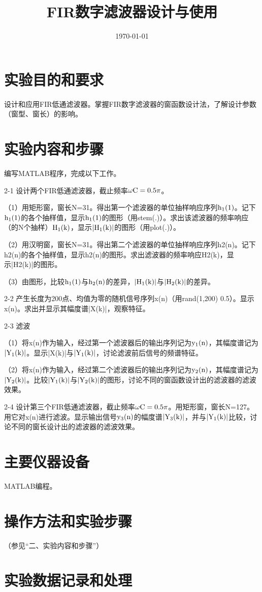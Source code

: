 \documentclass{../source/Experiment}
\title{FIR数字滤波器设计与使用}
\date{\today}
\begin{document}
\makeheader
\section{实验目的和要求}
设计和应用FIR低通滤波器。掌握FIR数字滤波器的窗函数设计法，了解设计参数（窗型、窗长）的影响。
\section{实验内容和步骤}
编写MATLAB程序，完成以下工作。

2-1 设计两个FIR低通滤波器，截止频率$ \rm \omega C = 0.5 \pi$。

（1）用矩形窗，窗长N=31。得出第一个滤波器的单位抽样响应序列$ \rm h_1(1)$。记下$ \rm h_1(1)$的各个抽样值，显示$ \rm h_1(1)$的图形（用stem(.)）。求出该滤波器的频率响应（的N个抽样）$ \rm H_1(k)$，显示$| \rm H_1(k)|$的图形（用plot(.)）。

（2）用汉明窗，窗长N=31。得出第二个滤波器的单位抽样响应序列h2(n)。记下h2(n)的各个抽样值，显示h2(n)的图形。求出滤波器的频率响应H2(k)，显示|H2(k)|的图形。

（3）由图形，比较$ \rm h_1(1)$与$ \rm h_2(n)$的差异，$| \rm H_1(k)|$与$\rm |H_2(k)|$的差异。

2-2 产生长度为200点、均值为零的随机信号序列x(n)（用rand(1,200)  0.5）。显示x(n)。求出并显示其幅度谱|X(k)|，观察特征。

2-3 滤波

（1）将x(n)作为输入，经过第一个滤波器后的输出序列记为$ \rm y_1(n)$，其幅度谱记为$|\rm Y_1(k)|$。显示|X(k)|与$\rm |Y_1(k)|$，讨论滤波前后信号的频谱特征。

（2）将x(n)作为输入，经过第二个滤波器后的输出序列记为$\rm y_2(n)$，其幅度谱记为$|\rm Y_2(k)|$。比较$|\rm Y_1(k)|$与$|\rm Y_2(k)|$的图形，讨论不同的窗函数设计出的滤波器的滤波效果。

2-4 设计第三个FIR低通滤波器，截止频率$\rm \omega C=0.5\pi$。用矩形窗，窗长N=127。用它对x(n)进行滤波。显示输出信号$ \rm y_3(n)$的幅度谱$\rm |Y_3(k)|$，并与$\rm |Y_1(k)|$比较，讨论不同的窗长设计出的滤波器的滤波效果。
\section{主要仪器设备}
MATLAB编程。
\section{操作方法和实验步骤}
（参见“二、实验内容和步骤”）
\section{实验数据记录和处理}
\end{document}
